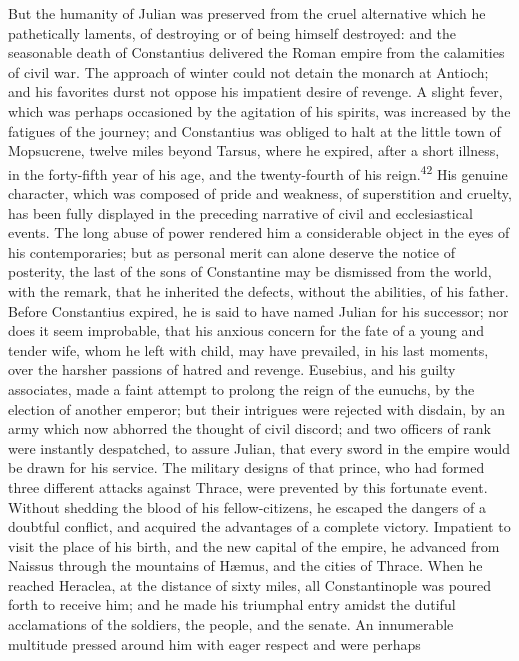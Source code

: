 But the humanity of Julian was preserved from the cruel
alternative which he pathetically laments, of destroying or of
being himself destroyed: and the seasonable death of Constantius
delivered the Roman empire from the calamities of civil war. The
approach of winter could not detain the monarch at Antioch; and
his favorites durst not oppose his impatient desire of revenge. A
slight fever, which was perhaps occasioned by the agitation of
his spirits, was increased by the fatigues of the journey; and
Constantius was obliged to halt at the little town of Mopsucrene,
twelve miles beyond Tarsus, where he expired, after a short
illness, in the forty-fifth year of his age, and the
twenty-fourth of his reign.\textsuperscript{42} His genuine character, which was
composed of pride and weakness, of superstition and cruelty, has
been fully displayed in the preceding narrative of civil and
ecclesiastical events. The long abuse of power rendered him a
considerable object in the eyes of his contemporaries; but as
personal merit can alone deserve the notice of posterity, the
last of the sons of Constantine may be dismissed from the world,
with the remark, that he inherited the defects, without the
abilities, of his father. Before Constantius expired, he is said
to have named Julian for his successor; nor does it seem
improbable, that his anxious concern for the fate of a young and
tender wife, whom he left with child, may have prevailed, in his
last moments, over the harsher passions of hatred and revenge.
Eusebius, and his guilty associates, made a faint attempt to
prolong the reign of the eunuchs, by the election of another
emperor; but their intrigues were rejected with disdain, by an
army which now abhorred the thought of civil discord; and two
officers of rank were instantly despatched, to assure Julian,
that every sword in the empire would be drawn for his service.
The military designs of that prince, who had formed three
different attacks against Thrace, were prevented by this
fortunate event. Without shedding the blood of his
fellow-citizens, he escaped the dangers of a doubtful conflict,
and acquired the advantages of a complete victory. Impatient to
visit the place of his birth, and the new capital of the empire,
he advanced from Naissus through the mountains of Hæmus, and the
cities of Thrace. When he reached Heraclea, at the distance of
sixty miles, all Constantinople was poured forth to receive him;
and he made his triumphal entry amidst the dutiful acclamations
of the soldiers, the people, and the senate. An innumerable
multitude pressed around him with eager respect and were perhaps
